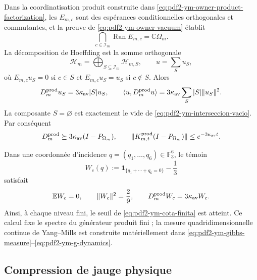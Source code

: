 Dans la coordinatisation produit construite dans \eqref{eq:pdf2-ym-owner-product-factorization}, les $E_{m,c}$ sont des espérances conditionnelles orthogonales et commutantes, et la preuve de \eqref{eq:pdf2-ym-owner-vacuum} établit
\begin{equation}\label{eq:pdf2-ym-interseccion-vacio}
 \bigcap_{c\in\mathcal I_m}\operatorname{Ran}E_{m,c}
 =\mathbb C\Omega_m.
\end{equation}
La décomposition de Hoeffding est la somme orthogonale
\[
 \mathcal H_m=\bigoplus_{S\subseteq\mathcal I_m}\mathcal H_{m,S},
 \qquad u=\sum_Su_S,
\]
où $E_{m,c}u_S=0$ si $c\in S$ et $E_{m,c}u_S=u_S$ si $c\notin S$. Alors
\begin{equation}\label{eq:pdf2-ym-hoeffding}
 D_m^{\rm prod}u_S=3\kappa_{\rm av}|S|u_S,
 \qquad
 \langle u,D_m^{\rm prod}u\rangle
 =3\kappa_{\rm av}\sum_S|S|\|u_S\|^2.
\end{equation}
La composante $S=\varnothing$ est exactement le vide de
\eqref{eq:pdf2-ym-interseccion-vacio}. Par conséquent
\begin{equation}\label{eq:pdf2-ym-cota-finita}
 D_m^{\rm prod}\succeq
 3\kappa_{\rm av}(I-P_{\Omega_m}),
 \qquad
 \|K^{\rm prod}_{m,t}(I-P_{\Omega_m})\|
 \le e^{-3\kappa_{\rm av}t}.
\end{equation}

Dans une coordonnée d’incidence
$q=(q_1,\ldots,q_6)\in\mathbb F_3^6$, le témoin
\begin{equation}\label{eq:pdf2-ym-wc}
 W_c(q):=\mathbf1_{\{q_1+\cdots+q_6=0\}}-\frac13
\end{equation}
satisfait
\begin{equation}\label{eq:pdf2-ym-wc-momentos}
 \mathbb EW_c=0,\qquad \|W_c\|^2=\frac29,\qquad
 D_m^{\rm prod}W_c=3\kappa_{\rm av}W_c.
\end{equation}
Ainsi, à chaque niveau fini, le seuil de \eqref{eq:pdf2-ym-cota-finita} est atteint. Ce calcul fixe le spectre du générateur produit fini ; la mesure quadridimensionnelle continue de Yang--Mills est construite matériellement dans \eqref{eq:pdf2-ym-gibbs-measure}--\eqref{eq:pdf2-ym-g-dynamics}.

\subsection{Compression de jauge physique}

